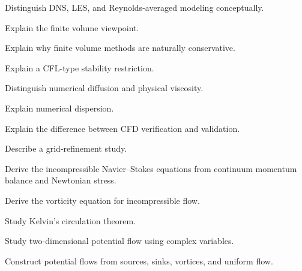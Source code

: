 \begin{exercise}[2]
Distinguish DNS, LES, and Reynolds-averaged modeling conceptually.
\end{exercise}

\begin{exercise}[2]
Explain the finite volume viewpoint.
\end{exercise}

\begin{exercise}[3]
Explain why finite volume methods are naturally conservative.
\end{exercise}

\begin{exercise}[3]
Explain a CFL-type stability restriction.
\end{exercise}

\begin{exercise}[3]
Distinguish numerical diffusion and physical viscosity.
\end{exercise}

\begin{exercise}[3]
Explain numerical dispersion.
\end{exercise}

\begin{exercise}[3]
Explain the difference between CFD verification and validation.
\end{exercise}

\begin{exercise}[3]
Describe a grid-refinement study.
\end{exercise}

\begin{exercise}[4]
Derive the incompressible Navier--Stokes equations from continuum momentum
balance and Newtonian stress.
\end{exercise}

\begin{exercise}[4]
Derive the vorticity equation for incompressible flow.
\end{exercise}

\begin{exercise}[4]
Study Kelvin's circulation theorem.
\end{exercise}

\begin{exercise}[4]
Study two-dimensional potential flow using complex variables.
\end{exercise}

\begin{exercise}[4]
Construct potential flows from sources, sinks, vortices, and uniform flow.
\end{exercise}

